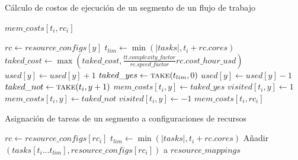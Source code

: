 \begin{algorithm}
\caption{C\'alculo de costos de ejecución de un segmento de un flujo de trabajo}
\label{alg_blind_take}
\begin{algorithmic}[1]
	\EndIf
		\State \Return $mem\_costs[t_i, rc_i]$
	\EndIf

		\State $rc \gets resource\_configs[y]$
		\State $t_{lim} \gets \min(|tasks|, t_i + rc.cores)$ 
		 
			\State $taked\_cost \gets \max(taked\_cost, \frac{tt.complexity\_factor}{rc.speed\_factor} rc.cost\_hour\_usd)$
		\EndFor
		\State $used[y] \gets used[y] + 1$
		\State $taked\_yes \gets \Call{take}{t_{lim}, 0}$
		\State $used[y] \gets used[y] - 1$
		\State $taked\_not \gets \Call{take}{t_i, y + 1}$
			\State $mem\_costs[t_i, y] \gets taked\_yes$
			\State $visited[t_i, y] \gets 1$
		\Else
			\State $mem\_costs[t_i, y] \gets taked\_not$
			\State $visited[t_i, y] \gets -1$
		\EndIf
	\EndFor
	\State \Return $mem\_costs[t_i, rc_i]$
\EndProcedure
\end{algorithmic}
\end{algorithm}

\begin{algorithm}
\caption{Asignación de tareas de un segmento a configuraciones de recursos}
\label{alg_blind_check_take}
\begin{algorithmic}[1]
			\State $rc \gets resource\_configs[rc_i]$
			\State $t_{lim} \gets \min(|tasks|, t_i + rc.cores)$
			\State Añadir $(tasks[t_i \dots t_{lim}], resource\_configs[rc_i])$ a $resource\_mappings$
			\State {}
			\State {}	
		\EndIf
	\EndIf
\EndProcedure
\end{algorithmic}
\end{algorithm}

